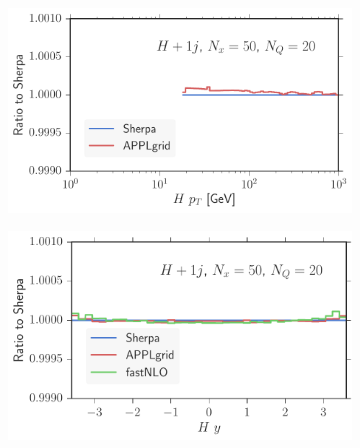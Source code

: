 \begin{figure}
\centering
\begin{subfigure}[]{0.49\textwidth}
	\includegraphics[width=\textwidth]{images/hjb_hpt.pdf}
\end{subfigure}
\begin{subfigure}[]{0.49\textwidth}
	\includegraphics[width=\textwidth]{images/hjb_hy.pdf}
\end{subfigure}


\end{figure}
